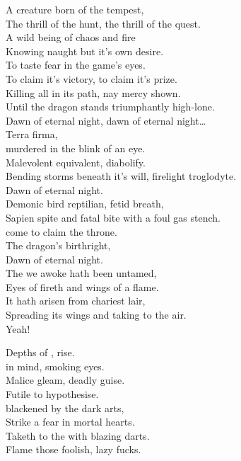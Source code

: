 
A creature born of the tempest, \\
The thrill of the hunt, the thrill of the quest. \\
A wild being of chaos and fire \\
Knowing naught but it's own desire. \\
To taste fear in the game's eyes. \\
To claim it's victory, to claim it's prize. \\
Killing all in its path, nay mercy shown. \\
Until the dragon stands triumphantly high-lone. \\

Dawn of eternal night, dawn of eternal night… \\

Terra firma, \\
 murdered in the blink of an eye. \\
Malevolent equivalent, diabolify. \\
Bending storms beneath it's will, firelight troglodyte. \\
Dawn of eternal night. \\

Demonic bird reptilian,  fetid breath, \\
Sapien spite and fatal bite with a foul gas stench. \\
 come to claim the throne. \\
The dragon's birthright, \\
Dawn of eternal night. \\

The  we awoke hath been untamed, \\
Eyes of fireth and wings of a flame. \\
It hath arisen from chariest lair, \\
Spreading its wings and taking to the air. \\
Yeah! \\




Depths of ,  rise. \\
 in mind, smoking eyes. \\
Malice gleam, deadly guise. \\
Futile to hypothesise. \\
 blackened by the dark arts, \\
Strike a fear in mortal hearts. \\
Taketh to the  with blazing darts. \\
Flame those foolish, lazy fucks. \\

